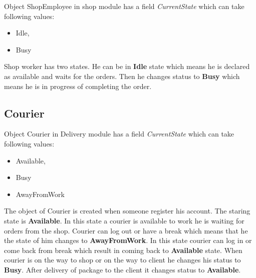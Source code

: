 \documentclass[../main.tex]{subfiles}
\begin{document}
Object ShopEmployee in shop module has a field \textit{CurrentState} which can take following values:

\begin{itemize}
\item Idle,
\item Busy
\end{itemize}

Shop worker has two states. He can be in \textbf{Idle} state which means he is declared as available and waits for the orders. Then he changes status to \textbf{Busy} which means he is in progress of completing the order.


\subsection{Courier}
\vspace{5mm}

Object Courier in Delivery module has a field \textit{CurrentState} which can take following values:

\begin{itemize}
\item Available,
\item Busy
\item AwayFromWork
\end{itemize}
\vspace{5mm}
The object of Courier is created when someone register his account. The staring state is \textbf{Available}. In this state a courier is available to work he is waiting for orders from the shop. Courier can log out or have a break which means that he the state of him changes to \textbf{AwayFromWork}. In this state courier can log in or come back from break which result in coming back to \textbf{Available} state. When courier is on the way to shop or on the way to client he changes his status to \textbf{Busy}. After delivery of package to the client it changes status to \textbf{Available}.
\end{document}
